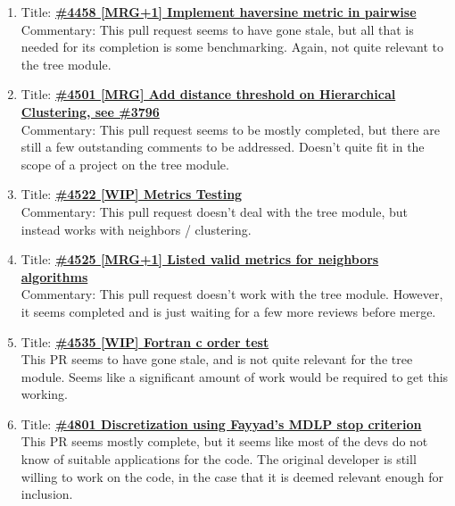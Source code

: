 \documentclass[12pt, oneside]{article}
\begin{document}
\begin{enumerate}
  \item 
  Title:
  \textbf{\href{https://github.com/scikit-learn/scikit-learn/pull/4458}    
    {\#4458 [MRG+1] Implement haversine metric in pairwise}}\\
  Commentary: This pull request seems to have gone stale, but all that
  is needed for its completion is some benchmarking. Again, not quite
  relevant to the tree module.

  \item 
  Title:
  \textbf{\href{https://github.com/scikit-learn/scikit-learn/pull/4501}
    {\#4501 [MRG] Add distance threshold on Hierarchical Clustering,
      see \#3796}}\\
  Commentary: This pull request seems to be mostly completed, but
  there are still a few outstanding comments to be addressed. Doesn't
  quite fit in the scope of a project on the tree module.

  \item 
  Title:
  \textbf{\href{https://github.com/scikit-learn/scikit-learn/pull/4522}
    {\#4522 [WIP] Metrics Testing}}\\
  Commentary: This pull request doesn't deal with the tree module, but
  instead works with neighbors / clustering.

  \item 
  Title:
  \textbf{\href{https://github.com/scikit-learn/scikit-learn/pull/4525}
    {\#4525 [MRG+1] Listed valid metrics for neighbors algorithms}}\\
  Commentary: This pull request doesn't work with the tree
  module. However, it seems completed and is just waiting for a
  few more reviews before merge.

  \item
  Title:
  \textbf{\href{https://github.com/scikit-learn/scikit-learn/pull/4535}
    {\#4535 [WIP] Fortran c order test}}\\
  This PR seems to have gone stale, and is not quite relevant for the
  tree module. Seems like a significant amount of work would be
  required to get this working.

  \item
  Title:
  \textbf{\href{https://github.com/scikit-learn/scikit-learn/pull/4801}
    {\#4801 Discretization using Fayyad's MDLP stop criterion }}\\
  This PR seems mostly complete, but it seems like most of the devs do
  not know of suitable applications for the code. The original
  developer is still willing to work on the code, in the case that it
  is deemed relevant enough for inclusion.


\end{enumerate}
\end{document}
